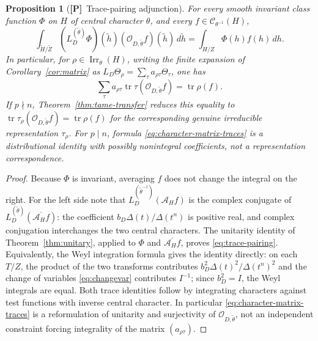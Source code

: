 \documentclass[11pt]{article}
\newcommand{\Irr}{\operatorname{Irr}}
\newcommand{\tH}{\widetilde H}
\newcommand{\tZ}{\widetilde Z}
\newcommand{\Ptag}{\textnormal{\textbf{[P]}}}
\theoremstyle{plain}
\newtheorem{proposition}[theorem]{Proposition}
\theoremstyle{definition}
\begin{document}
\begin{proposition}[\Ptag\ Trace-pairing adjunction]\label{prop:trace-pair}
For every smooth invariant class function $\Phi$ on $H$ of central
character $\theta$, and every $f\in\mathcal C_{\theta^{-1}}(H)$,
\begin{equation}\label{eq:trace-pairing}
\boxed{\quad
\int_{\tH/\tZ}
(L_D^{(\widetilde\theta)}\Phi)(\widetilde h)
 (\mathcal O_{D,\widetilde\theta}f)(\widetilde h)\,d\widetilde h
=\int_{H/Z}\Phi(h)f(h)\,dh.
\quad}
\end{equation}
In particular, for $\rho\in\Irr_\theta(H)$, writing the finite
expansion of Corollary~\ref{cor:matrix} as
$L_D\Theta_\rho=\sum_\tau a_{\rho\tau}\Theta_\tau$, one has
\begin{equation}\label{eq:character-matrix-traces}
\sum_\tau a_{\rho\tau}
\operatorname{tr}\tau(\mathcal O_{D,\widetilde\theta}f)
=\operatorname{tr}\rho(f).
\end{equation}
If $p\nmid n$, Theorem~\ref{thm:tame-transfer} reduces this equality to
$\operatorname{tr}\tau_\rho(\mathcal O_{D,\widetilde\theta}f)
=\operatorname{tr}\rho(f)$ for the corresponding genuine irreducible
representation $\tau_\rho$. For $p\mid n$, formula
\eqref{eq:character-matrix-traces} is a distributional identity with
possibly nonintegral coefficients, \emph{not} a representation
correspondence.
\end{proposition}
\begin{proof}
Because $\Phi$ is invariant, averaging $f$ does not change the integral
on the right. For the left side note that
$L_D^{(\widetilde\theta^{-1})}(\mathcal A_H f)$ is the complex
conjugate of
$L_D^{(\widetilde\theta)}(\overline{\mathcal A_H f})$:
the coefficient $b_D\Delta(t)/\Delta(t^n)$ is positive real, and
complex conjugation interchanges the two central characters.
The unitarity identity of Theorem~\ref{thm:unitary}, applied to $\Phi$
and $\overline{\mathcal A_H f}$, proves
\eqref{eq:trace-pairing}.
Equivalently, the Weyl integration formula gives the identity directly:
on each $T/Z$, the product of the two transforms contributes
$b_D^2\Delta(t)^2/\Delta(t^n)^2$ and the change of variables
\eqref{eq:changevar} contributes $I^{-1}$; since $b_D^2=I$, the
Weyl integrals are equal. Both trace identities follow by integrating
characters against test functions with inverse central character.
In particular \eqref{eq:character-matrix-traces} is a reformulation
of unitarity and surjectivity of $\mathcal O_{D,\widetilde\theta}$,
not an independent constraint forcing integrality of the matrix
$(a_{\rho\tau})$.
\end{proof}
\end{document}
